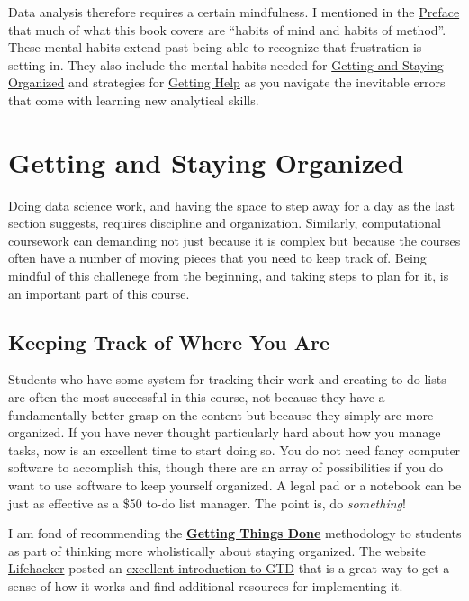 \documentclass[]{book}
\theoremstyle{definition}
\theoremstyle{definition}
\theoremstyle{definition}
\theoremstyle{remark}
\begin{document}
Data analysis therefore requires a certain mindfulness. I mentioned in
the \protect\hyperlink{preface}{Preface} that much of what this book
covers are ``habits of mind and habits of method''. These mental habits
extend past being able to recognize that frustration is setting in. They
also include the mental habits needed for
\protect\hyperlink{getting-and-staying-organized}{Getting and Staying
Organized} and strategies for \protect\hyperlink{getting-help}{Getting
Help} as you navigate the inevitable errors that come with learning new
analytical skills.

\hypertarget{getting-and-staying-organized}{\section{Getting and Staying
Organized}\label{getting-and-staying-organized}}

Doing data science work, and having the space to step away for a day as
the last section suggests, requires discipline and organization.
Similarly, computational coursework can demanding not just because it is
complex but because the courses often have a number of moving pieces
that you need to keep track of. Being mindful of this challenege from
the beginning, and taking steps to plan for it, is an important part of
this course.

\subsection{Keeping Track of Where You
Are}\label{keeping-track-of-where-you-are}

Students who have some system for tracking their work and creating to-do
lists are often the most successful in this course, not because they
have a fundamentally better grasp on the content but because they simply
are more organized. If you have never thought particularly hard about
how you manage tasks, now is an excellent time to start doing so. You do
not need fancy computer software to accomplish this, though there are an
array of possibilities if you do want to use software to keep yourself
organized. A legal pad or a notebook can be just as effective as a \$50
to-do list manager. The point is, do \emph{something}!

I am fond of recommending the
\href{http://gettingthingsdone.com}{\textbf{Getting Things Done}}
methodology to students as part of thinking more wholistically about
staying organized. The website \href{https://lifehacker.com}{Lifehacker}
posted an
\href{https://lifehacker.com/productivity-101-a-primer-to-the-getting-things-done-1551880955}{excellent
introduction to GTD} that is a great way to get a sense of how it works
and find additional resources for implementing it.
\end{document}

